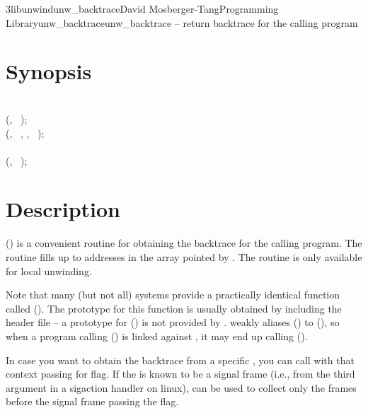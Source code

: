 \documentclass{article}
\begin{document}
\begin{Name}{3libunwind}{unw\_backtrace}{David Mosberger-Tang}{Programming Library}{unw\_backtrace}unw\_backtrace -- return backtrace for the calling program
\end{Name}

\section{Synopsis}

\\

 (, ~);\\
 (, ~, , ~);\\

\\

 (, ~);\\

\section{Description}

() is a convenient routine for obtaining the backtrace for
the calling program. The routine fills up to  addresses in the array
pointed by . The routine is only available for local unwinding.

Note that many (but not all) systems provide a practically identical function
called (). The prototype for this function is usually obtained
by including the  header file -- a prototype for
() is not provided by .  weakly
aliases () to (), so when a program
calling () is linked against , it may end up
calling ().

In case you want to obtain the backtrace from a specific ,
you can call  with that context passing  for flag.
If the  is known to be a signal frame (i.e., from the third argument
in a sigaction handler on linux),  can be used to collect
only the frames before the signal frame passing the  flag.
\end{document}
